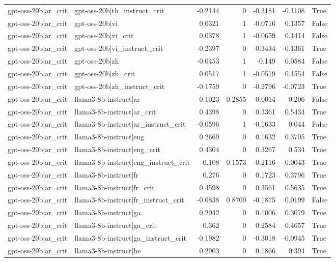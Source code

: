 \begin{table}
\begin{tabular}{l l r r r r l}
gpt-oss-20b|ar_crit & gpt-oss-20b|th_instruct_crit & -0.2144 & 0 & -0.3181 & -0.1108 & True \\
gpt-oss-20b|ar_crit & gpt-oss-20b|vi & 0.0321 & 1 & -0.0716 & 0.1357 & False \\
gpt-oss-20b|ar_crit & gpt-oss-20b|vi_crit & 0.0378 & 1 & -0.0659 & 0.1414 & False \\
gpt-oss-20b|ar_crit & gpt-oss-20b|vi_instruct_crit & -0.2397 & 0 & -0.3434 & -0.1361 & True \\
gpt-oss-20b|ar_crit & gpt-oss-20b|zh & -0.0453 & 1 & -0.149 & 0.0584 & False \\
gpt-oss-20b|ar_crit & gpt-oss-20b|zh_crit & 0.0517 & 1 & -0.0519 & 0.1554 & False \\
gpt-oss-20b|ar_crit & gpt-oss-20b|zh_instruct_crit & -0.1759 & 0 & -0.2796 & -0.0723 & True \\
gpt-oss-20b|ar_crit & llama3-8b-instruct|ar & 0.1023 & 0.2855 & -0.0014 & 0.206 & False \\
gpt-oss-20b|ar_crit & llama3-8b-instruct|ar_crit & 0.4398 & 0 & 0.3361 & 0.5434 & True \\
gpt-oss-20b|ar_crit & llama3-8b-instruct|ar_instruct_crit & -0.0596 & 1 & -0.1633 & 0.044 & False \\
gpt-oss-20b|ar_crit & llama3-8b-instruct|eng & 0.2669 & 0 & 0.1632 & 0.3705 & True \\
gpt-oss-20b|ar_crit & llama3-8b-instruct|eng_crit & 0.4304 & 0 & 0.3267 & 0.534 & True \\
gpt-oss-20b|ar_crit & llama3-8b-instruct|eng_instruct_crit & -0.108 & 0.1573 & -0.2116 & -0.0043 & True \\
gpt-oss-20b|ar_crit & llama3-8b-instruct|fr & 0.276 & 0 & 0.1723 & 0.3796 & True \\
gpt-oss-20b|ar_crit & llama3-8b-instruct|fr_crit & 0.4598 & 0 & 0.3561 & 0.5635 & True \\
gpt-oss-20b|ar_crit & llama3-8b-instruct|fr_instruct_crit & -0.0838 & 0.8709 & -0.1875 & 0.0199 & False \\
gpt-oss-20b|ar_crit & llama3-8b-instruct|ga & 0.2042 & 0 & 0.1006 & 0.3079 & True \\
gpt-oss-20b|ar_crit & llama3-8b-instruct|ga_crit & 0.362 & 0 & 0.2584 & 0.4657 & True \\
gpt-oss-20b|ar_crit & llama3-8b-instruct|ga_instruct_crit & -0.1982 & 0 & -0.3018 & -0.0945 & True \\
gpt-oss-20b|ar_crit & llama3-8b-instruct|he & 0.2903 & 0 & 0.1866 & 0.394 & True \\

\end{tabular}
\end{table}

